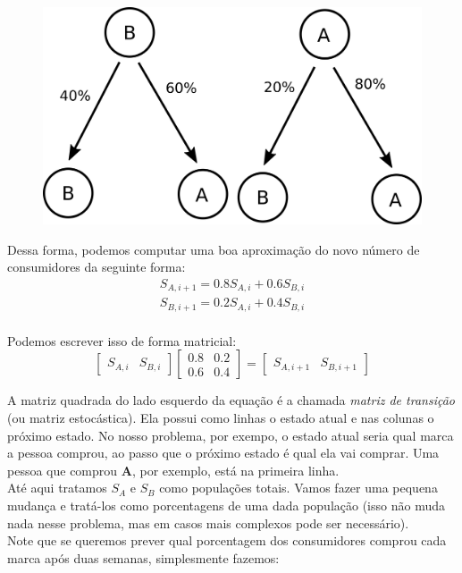 \documentclass[12pt]{article}
\begin{document}
\begin{figure}[H]
\centering
\includegraphics[scale=0.6]{fig2.png}
\end{figure}

Dessa forma, podemos computar uma boa aproximação do novo número de consumidores da seguinte forma:\\
\begin{align*}
	S_{A, i+1} = 0.8S_{A, i} + 0.6S_{B, i}\\
	S_{B, i+1} = 0.2S_{A, i} + 0.4S_{B, i}\\	
\end{align*}

Podemos escrever isso de forma matricial:\\

\begin{equation}
\begin{bmatrix}
S_{A, i} & S_{B, i}
\end{bmatrix}
\begin{bmatrix}
0.8 & 0.2\\
0.6 & 0.4
\end{bmatrix}
=
\begin{bmatrix}
S_{A, i+1} & S_{B, i+1}
\end{bmatrix}
\end{equation}

A matriz quadrada do lado esquerdo da equação é a chamada \textit{matriz de transição} (ou matriz estocástica). Ela possui como linhas o estado atual e nas colunas o próximo estado. No nosso problema, por exempo, o estado atual seria qual marca a pessoa comprou, ao passo que o próximo estado é qual ela vai comprar. Uma pessoa que comprou \textbf{A}, por exemplo, está na primeira linha.\\
Até aqui tratamos $S_A$ e $S_B$ como populações totais. Vamos fazer uma pequena mudança e tratá-los como porcentagens de uma dada população (isso não muda nada nesse problema, mas em casos mais complexos pode ser necessário).\\
Note que se queremos prever qual porcentagem dos consumidores comprou cada marca após duas semanas, simplesmente fazemos:\\
\end{document}
